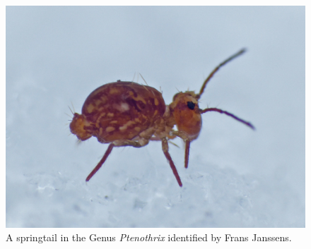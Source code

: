 \begin{figure}[H]
\begin{center}
\vspace{2mm}
\includegraphics[width=\textwidth]{img/Ptenothrix.jpg}
\caption{A springtail in the Genus \textit{Ptenothrix} identified by Frans Janssens.}
\label{Ptenothrix}
\end{center}
\end{figure}

